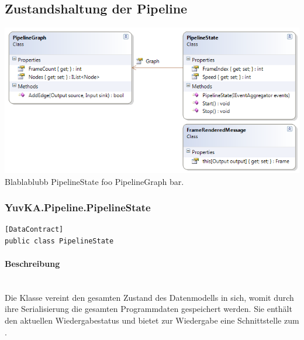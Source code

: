 \subsection{Zustandshaltung der Pipeline}

\includegraphics[width=\textwidth]{YuvKA.Pipeline/states.png}
Blablablubb PipelineState foo PipelineGraph bar.

\subsubsection{YuvKA.Pipeline.PipelineState}

\begin{verbatim}
[DataContract]
public class PipelineState
\end{verbatim}

\paragraph{Beschreibung}~\\
Die Klasse  vereint den gesamten Zustand des Datenmodells in sich, womit durch ihre Serialisierung die gesamten Programmdaten gespeichert werden. Sie enthält den aktuellen Wiedergabestatus und bietet zur Wiedergabe eine Schnittstelle zum .

